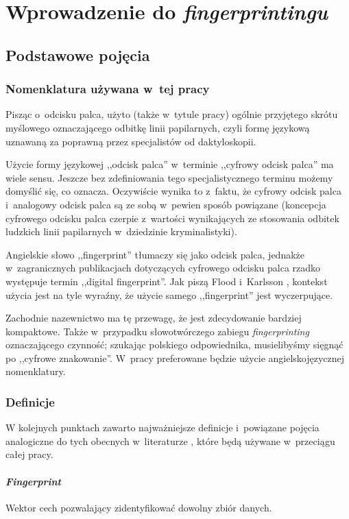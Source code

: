 \chapter{Wprowadzenie do \emph{fingerprintingu}}

\section{Podstawowe pojęcia}

\subsection{Nomenklatura używana w~tej pracy}
Pisząc o~odcisku palca, użyto (także w~tytule pracy) ogólnie przyjętego skrótu
myślowego oznaczającego odbitkę linii papilarnych, czyli formę językową uznawaną
za poprawną przez specjalistów od daktyloskopii.

Użycie formy językowej ,,odcisk palca'' w~terminie ,,cyfrowy odcisk palca'' ma
wiele sensu. Jeszcze bez zdefiniowania tego specjalistycznego terminu możemy
domyślić się, co oznacza. Oczywiście wynika to z~faktu, że cyfrowy odcisk palca
i~analogowy odcisk palca są ze sobą w~pewien sposób powiązane (koncepcja
cyfrowego odcisku palca czerpie z~wartości wynikających ze stosowania odbitek
ludzkich linii papilarnych w~dziedzinie kryminalistyki).

Angielskie słowo ,,fingerprint'' tłumaczy się jako odcisk palca, jednakże
w~zagranicznych publikacjach dotyczących cyfrowego odcisku palca rzadko
występuje termin ,,digital fingerprint''. Jak piszą Flood i~Karlsson \cite[s.
4]{flood2012browser}, kontekst użycia jest na tyle wyraźny, że użycie samego
,,fingerprint'' jest wyczerpujące.

Zachodnie nazewnictwo ma tę przewagę, że jest zdecydowanie bardziej kompaktowe.
Także w~przypadku słowotwórczego zabiegu \emph{fingerprinting} oznaczającego
czynność; szukając polskiego odpowiednika, musielibyśmy sięgnąć po ,,cyfrowe
znakowanie''. W~pracy preferowane będzie użycie angielskojęzycznej nomenklatury.

\subsection{Definicje}
W kolejnych punktach zawarto najważniejsze definicje i~powiązane pojęcia
analogiczne do tych obecnych w~literaturze
\cite{eckersley2010unique,flood2012browser}, które będą używane w~przeciągu
całej pracy.

\subsubsection{\emph{Fingerprint}}
Wektor cech pozwalający zidentyfikować dowolny zbiór danych.

